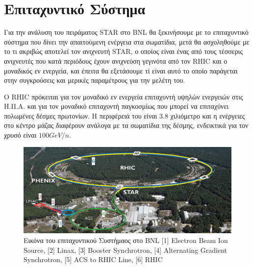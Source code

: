 \chapter{Επιταχυντικό Σύστημα}
	Για την ανάλυση του πειράματος STAR στο BNL θα ξεκινήσουμε με το επιταχυντικό σύστημα που δίνει την απαιτούμενη ενέργεια στα σωματίδια, μετά θα ασχοληθούμε με το τι ακριβώς αποτελεί τον ανιχνευτή STAR, ο οποίος είναι ένας από τους τέσσερις ανιχνευτές που κατά περιόδους έχουν ανιχνεύση γεγινότα από τον RHIC και ο μοναδικός εν ενεργεία, και έπειτα θα εξετάσουμε τί είναι αυτό το οποίο παράγεται στην συγκρούσεις και μερικές παραμέτρους για την μελέτη του.
	
	

	Ο RHIC πρόκειται για τον μοναδικό εν ενεργεία επιταχυντή υψηλών ενεργειών στις Η.Π.Α. και για τον μοναδικό επιταχυντή παγκοσμίως που μπορεί να επιταχύνει πολωμένες δέσμες πρωτονίων. Η περιφέρειά του είναι 3.8 χιλιόμετρο και η ενέργειες στο κέντρο μάζας διαφέρουν ανάλογα με τα σωματίδια της δέσμης, ενδεικτικά για τον χρυσό είναι $100GeV/n$.

\begin{figure}[h!]\label{fig2.1}
	\centering
	\includegraphics[scale=0.5]{Accelerating_System/written}
	\caption{Εικόνα του επιταχυντικού Συστήμαος στο BNL [1] Electron Beam Ion Source, [2] Linax, [3] Booster Synchrotron, [4] Alternating Gradient Synchrotron, [5] ACS to RHIC Line, [6] RHIC}
\end{figure}


